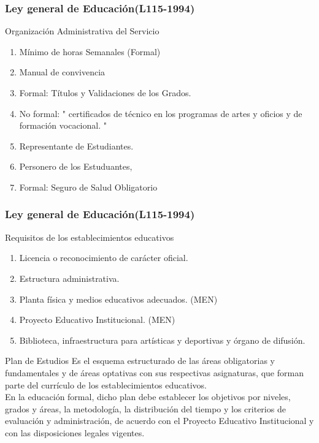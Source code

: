 \documentclass{beamer}
\begin{document}
\begin{frame}
\frametitle{Ley general de Educaci\'on(L115-1994)}
\begin{block}{Organizaci\'on Administrativa del Servicio}
\begin{enumerate}
\item M\'inimo de horas Semanales (Formal)
\item Manual de convivencia
\item Formal: T\'itulos y Validaciones de los Grados.
\item No formal: " 	certificados de técnico en los programas de artes y oficios y de formación vocacional. "
\item Representante de Estudiantes. 
\item Personero de los Estuduantes, 
\item Formal: Seguro de Salud Obligatorio
\end{enumerate}
\end{block}
\end{frame}

\begin{frame}
\frametitle{Ley general de Educaci\'on(L115-1994)}
\begin{block}{Requisitos de los establecimientos educativos}
\begin{enumerate}
\item Licencia o reconocimiento de car\'acter oficial.
\item Estructura administrativa.
\item Planta f\'isica y medios educativos adecuados. (MEN) 
\item Proyecto Educativo Institucional. (MEN) 
\item Biblioteca,  infraestructura para art\'isticas y deportivas y \'organo de difusi\'on. 
\end{enumerate}
\end{block}
\end{frame}

\begin{frame}
\begin{block}{Plan de Estudios}
Es el esquema estructurado de las \'areas obligatorias y fundamentales y de \'areas optativas con sus respectivas asignaturas, que forman parte del curr\'iculo de los establecimientos educativos.\\
En la educaci\'on formal, dicho plan debe establecer los objetivos por niveles, grados y \'areas, la metodolog\'ia, la distribuci\'on del tiempo y los criterios de evaluaci\'on y administraci\'on, de acuerdo con el Proyecto Educativo Institucional y con las disposiciones legales vigentes.
\end{block}
\end{frame}
\end{document}
